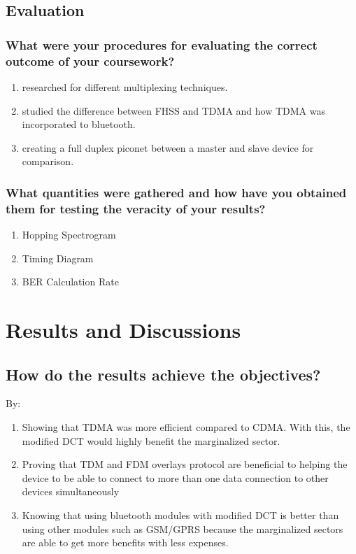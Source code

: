\subsection{Evaluation}
\label{sec:eval}

\subsubsection{What were your procedures for evaluating the correct outcome of your coursework?}
\begin{enumerate}
	\item researched for different multiplexing techniques.
	\item studied the difference between FHSS and TDMA and how TDMA was incorporated to bluetooth.
	\item creating a full duplex piconet between a master and slave device for comparison.
\end{enumerate}

\subsubsection{What quantities were gathered and how have you obtained them for testing the veracity of your results?}
\begin{enumerate}
	\item Hopping Spectrogram
	\item Timing Diagram
	\item BER Calculation Rate
\end{enumerate}


\section{Results and Discussions}

\subsection{How do the results achieve the objectives?}
By:
\begin{enumerate}
	\item Showing that TDMA was more efficient compared to CDMA. With this, the modified DCT would highly benefit the marginalized sector.
	\item Proving that TDM and FDM overlays protocol are beneficial to helping the device to be able to connect to more than one data connection to other devices simultaneously
	\item Knowing that using bluetooth modules with modified DCT is better than using other modules such as GSM/GPRS because the marginalized sectors are able to get more benefits with less expenses.
	
\end{enumerate}

